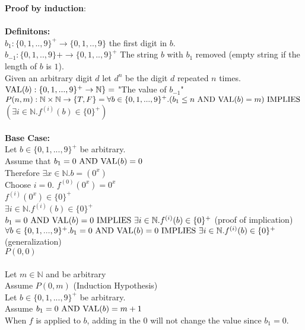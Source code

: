 \documentclass[11pt]{article}
\newcommand{\Implies}{\mbox{ IMPLIES }}
\newcommand{\And}{\mbox{ AND }}
\def\nats{{\mathbb N}}
\begin{document}
\begin{enumerate}
\begin{solution}
    {\bf Proof by induction}:\\\\
    {\bf Definitons:}\\
    $b_1: \{0,1,..,9\}^+ \rightarrow \{0,1,..,9\}$ the first digit in $b$.\\
    $b_{-1}: \{0,1,..,9\}+ \rightarrow \{0,1,..,9\}^+$ The string $b$ with $b_1$ removed (empty string if the length of $b$ is $1$).\\
    Given an arbitrary digit $d$ let $d^n$ be the digit $d$ repeated $n$ times.\\
    ${\rm VAL}(b): \{0,1,...,9\}^+ \rightarrow \nats\} = $ "The value of $b_{-1}$"\\
    $P(n, m): \nats\times\nats\rightarrow\{T,F\}  =\forall b\in\{0,1,...,9\}^+.( b_1 \le n\And {\rm VAL}(b) = m)\Implies$\\
    $(\exists i\in\nats.f^{(i)}(b)\in\{0\}^+)$\\\\
    {\bf Base Case:}\\
    \null\quad Let $b\in \{0,1,...,9\}^+$ be arbitrary.\\
    \null\qquad Assume that $b_1= 0\And {\rm VAL}(b)=0$\\
    \null\qquad Therefore $\exists x\in\nats.b=(0^x)$ \\
    \null\qquad Choose $i=0$. $f^{(0)}(0^x) = 0^x$\\
    \null\qquad $f^{(i)}(0^x)\in\{0\}^+$\\
    \null\qquad $\exists i\in\nats.f^{(i)}(b) \in \{0\}^+$\\
    \null\quad $b_1= 0\And {\rm VAL}(b)=0 \Implies\exists i\in\nats.f^{(i)}(b) \in \{0\}^+$ (proof of implication)\\
    $\forall b\in \{0,1,...,9\}^+.b_1= 0\And {\rm VAL}(b)=0 \Implies\exists i\in\nats.f^{(i)}(b) \in \{0\}^+$ (generalization)\\
    $P(0,0)$\\\\
    \null\quad Let $m\in\nats$ and be arbitrary\\
    \null\qquad Assume $P(0,m)$ (Induction Hypothesis)\\
    \null\qquad\quad Let $b\in\{0,1,...,9\}^+$ be arbitrary.\\
    \null\qquad\qquad Assume $b_1 = 0 \And {\rm VAL}(b) = m +1$\\
    \null\qquad\qquad When $f$ is applied to $b$, adding in the $0$ will not change the value since $b_1=0$.\\

\end{solution}
\end{enumerate}
\end{document}
